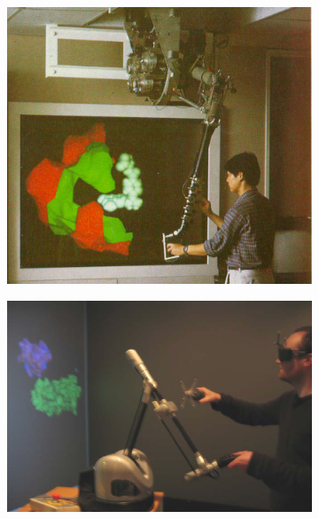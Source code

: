 \begin{figure}[h]
  \begin{subfigure}{.3\textwidth}
  \centering
  {\includegraphics[width=0.95\linewidth]{./figures/ch2/taylor_haptic}}
    \caption{}
    \label{Fig:taylor_haptic}
  \end{subfigure}
  \begin{subfigure}{.34\textwidth}
  \centering
  {\includegraphics[width=0.98\linewidth]{./figures/ch2/haptic_docking}}
    \caption{}
    \label{Fig:haptic_docking}
  \end{subfigure}

\end{figure}
